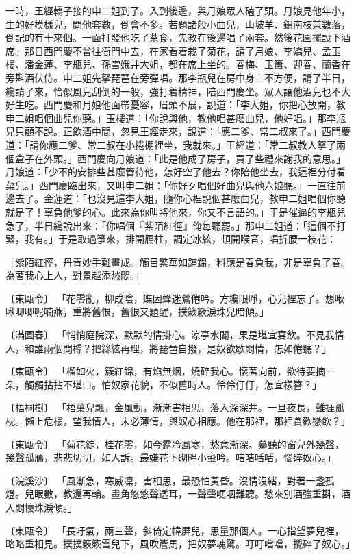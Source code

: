 一時，王經轎子接的申二姐到了。入到後邊，與月娘眾人磕了頭。月娘見他年小，生的好模樣兒，問他套數，倒會不多。若題諸般小曲兒，山坡羊、鎖南枝兼數落，倒記的有十來個。一面打發他吃了茶食，先教在後邊唱了兩套。然後花園擺設下酒席。那日西門慶不曾往衙門中去，在家看着栽了菊花，請了月娘、李嬌兒、孟玉樓、潘金蓮、李瓶兒、孫雪娥并大姐，都在席上坐的。春梅、玉簫、迎春、蘭香在旁斟酒伏侍。申二姐先拏琵琶在旁彈唱。那李瓶兒在房中身上不方便，請了半日，纔請了來，恰似風兒刮倒的一般，強打着精神，陪西門慶坐。眾人讓他酒兒也不大好生吃。西門慶和月娘他面帶憂容，眉頭不展，說道：「李大姐，你把心放開，教申二姐唱個曲兒你聽。」玉樓道：「你說與他，教他唱甚麼曲兒，他好唱。」那李瓶兒只顧不說。正飲酒中間，忽見王經走來，說道：「應二爹、常二叔來了。」西門慶道：「請你應二爹、常二叔在小捲棚裡坐，我就來。」王經道：「常二叔教人拏了兩個盒子在外頭。」西門慶向月娘道：「此是他成了房子，買了些禮來謝我的意思。」月娘道：「少不的安排些甚麼管待他，怎好空了他去？你陪他坐去，我這裡分付看菜兒。」西門慶臨出來，又叫申二姐：「你好歹唱個好曲兒與他六娘聽。」一直往前邊去了。金蓮道：「也沒見這李大姐，隨你心裡說個甚麼曲兒，教申二姐唱個你聽就是了！辜負他爹的心。此來為你叫將他來，你又不言語的。」于是催逼的李瓶兒急了，半日纔說出來：「你唱個『紫陌紅徑』俺每聽罷。」那申二姐道：「這個不打緊，我有。」于是取過箏來，排開鴈柱，調定冰絃，頓開喉音，唱折腰一枝花：

「紫陌紅徑，丹青妙手難畫成。觸目繁華如鋪錦，料應是春負我，非是辜負了春。為著我心上人，對景越添愁悶。」

〔東甌令〕  「花零亂，柳成陰，蝶因蜂迷鶯倦吟。方纔眼睜，心兒裡忘了。想啾啾唧唧呢喃燕，重將舊恨，舊恨又題醒，撲簌簌淚珠兒暗傾。」

〔滿園春〕  「悄悄庭院深，默默的情掛心。涼亭水閣，果是堪宜宴飲。不見我情人，和誰兩個問樽？把絲絃再理，將琵琶自撥，是奴欲歇悶情，怎如倦聽？」

〔東甌令〕  「榴如火，簇紅錦，有焰無烟，燒碎我心。懷著向前，欲待要摘一朵，觸觸拈拈不堪口。怕奴家花貌，不似舊時人。伶伶仃仃，怎宜樣簪？」

〔梧桐樹〕  「梧葉兒飄，金風動，漸漸害相思，落入深深井。一旦夜長，難捱孤枕。懶上危樓，望我情人，未必薄情，與奴心相應。他在那裡，那裡貪歡戀飲？」

〔東甌令〕  「菊花綻，桂花零，如今露冷風寒，愁意漸深。驀聽的窗兒外幾聲，幾聲孤鴈，悲悲切切，如人訴。最嫌花下砌畔小蛩吟。咭咭咶咶，惱碎奴心。」

〔浣溪沙〕  「風漸急，寒威凜，害相思，最恐怕黃昏。沒情沒緒，對著一盞孤燈。兒眼數，教還再輪。畫角悠悠聲透耳，一聲聲哽咽難聽。愁來別酒強重斟，酒入悶懷珠淚傾。」

〔東甌令〕 「長吁氣，兩三聲，斜倚定幃屏兒，思量那個人。一心指望夢兒裡，略略重相見。撲撲簌簌雪兒下，風吹簷馬，把奴夢魂驚。叮叮噹噹，攪碎了奴心。」

